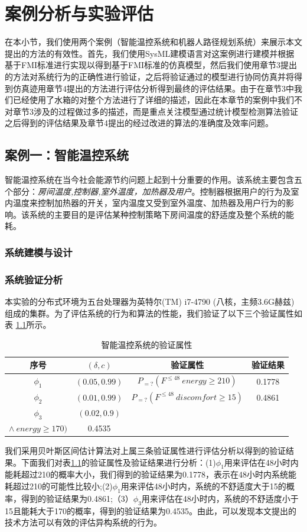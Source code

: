 \chapter{案例分析与实验评估}
\label{ch6}
在本小节，我们使用两个案例（智能温控系统和机器人路径规划系统）来展示本文提出的方法的有效性。首先，我们使用SysML建模语言对这案例进行建模并根据基于FMI标准进行实现以得到基于FMI标准的仿真模型，然后我们使用章节3提出的方法对系统行为的正确性进行验证，之后将验证通过的模型进行协同仿真并将得到仿真迹用章节4提出的方法进行评估分析得到最终的评估结果。由于在章节3中我们已经使用了水箱的对整个方法进行了详细的描述，因此在本章节的案例中我们不对章节3涉及的过程做过多的描述，而是重点关注模型通过统计模型检测算法验证之后得到的评估结果及章节4提出的经过改进的算法的准确度及效率问题。
\section{案例一：智能温控系统}
智能温控系统\cite{David2012An}在当今社会能源节约问题上起到十分重要的作用。该系统主要包含五个部分：\emph{房间温度,控制器,室外温度，加热器及用户}。控制器根据用户的行为及室内温度来控制加热器的开关，室内温度又受到室外温度、加热器及用户行为的影响。该系统的主要目的是评估某种控制策略下房间温度的舒适度及整个系统的能耗。
\subsection{系统建模与设计}

\subsection{系统验证分析}
本实验的分布式环境为五台处理器为英特尔(TM) i7-4790 (八核，主频3.6G赫兹)组成的集群。为了评估系统的行为和算法的性能，我们验证了以下三个验证属性如表 \ref{tb:property}所示。
\begin{table}[t]
	\caption{智能温控系统的验证属性}
	\label{tb:property}
	\centering
	\begin{tabular}{c c c c}
		\hline
		序号 &  $(\delta,c)$ & 验证属性 & 验证结果 \\
		\hline
		$\phi_1$ & $(0.05,0.99)$  & $P_{=?}(F^{\leq48}~energy \geq 210)$ & 0.1778 \\ 
		$\phi_2$ & $(0.01,0.99)$  & $P_{=?}(F^{\leq48}~discomfort \geq 15)$ & 0.4861\\
		$\phi_3$ & $(0.02,0.9)$ & 
		\tabincell{c}{$P_{=?}(F^{\leq48}~ discomfort \leq 15$ \\ $\wedge~energy \geq 170)$} & 0.4535 \\
		\hline
	\end{tabular}
\end{table}
我们采用贝叶斯区间估计算法对上属三条验证属性进行评估分析以得到的验证结果。下面我们对表\ref{tb:property}的验证属性及验证结果进行分析：(1)$\phi_1$用来评估在48小时内能耗超过210的概率大小，我们得到的验证结果为0.1778，表示在48小时内系统能耗超过210的可能性比较小;(2)$\phi_1$用来评估48小时内，系统的不舒适度大于15的概率，得到的验证结果为0.4861;（3）$\phi_3$用来评估在48小时内，系统的不舒适度小于15且能耗大于170的概率，得到的验证结果为0.4535。由此，可以发现本文提出的技术方法可以有效的评估异构系统的行为。

